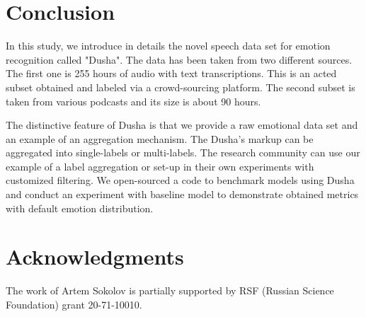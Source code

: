 \documentclass{article}
\begin{document}
\section{Conclusion}
In this study, we introduce in details the novel speech data set for emotion recognition called "Dusha". The data has been taken from two different sources. The first one is 255 hours of audio with text transcriptions. This is an acted subset obtained and labeled via a crowd-sourcing platform. The second subset is taken from various podcasts and its size is about 90 hours.

The distinctive feature of Dusha is that we provide a raw emotional data set and an example of an aggregation mechanism. The Dusha's markup can be aggregated into single-labels or multi-labels. The research community can use our example of a label aggregation or set-up in their own experiments with customized filtering.
We open-sourced a code to benchmark models using Dusha and conduct an experiment with baseline model to demonstrate obtained metrics with default emotion distribution.

\section{Acknowledgments}
The work of Artem Sokolov is partially supported by RSF (Russian Science Foundation) grant 20-71-10010.



\end{document}
